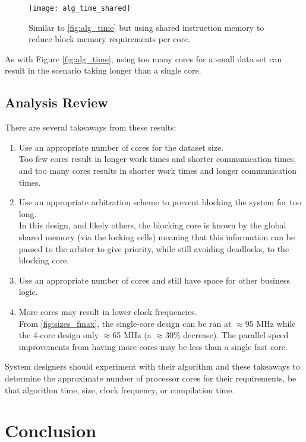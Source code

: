 \begin{figure}[h]
\centering
\texttt{[image: alg\_time\_shared]}
\caption{Similar to \cref{fig:alg_time} but using shared instruction memory to reduce block memory requirements per core.}
\label{fig:alg_time_shared}
\end{figure}

As with Figure \ref{fig:alg_time}, using too many cores for a small data set can result in the scenario taking longer than a single core.

\section{Analysis Review}
There are several takeaways from these results:
\begin{enumerate}
\item Use an appropriate number of cores for the dataset size.\\Too few cores result in longer work times and shorter communication times, and too many cores results in shorter work times and longer communication times.

\item Use an appropriate arbitration scheme to prevent blocking the system for too long.\\
In this design, and likely others, the blocking core is known by the global shared memory (via the locking cells) meaning that this information can be passed to the arbiter to give priority, while still avoiding deadlocks, to the blocking core.

\item Use an appropriate number of cores and still have space for other business logic.

\item More cores may result in lower clock frequencies.\\From \cref{fig:sizes_fmax}, the single-core design can be ran at $\approx$95 MHz while the 4-core design only $\approx$65 MHz (a $\approx$30\% decrease). The parallel speed improvements from having more cores may be less than a single fast core.
\end{enumerate}

System designers should experiment with their algorithm and these takeaways to determine the approximate number of processor cores for their requirements, be that algorithm time, size, clock frequency, or compilation time.



\chapter{Conclusion}
\startcontents[chapters]


